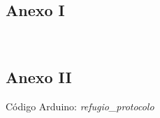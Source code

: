 \documentclass[12pt]{article}
\begin{document}
	\subsection*{Anexo I}
	\label{anexo I: ficha tecnica}
	 \\
	
	\pagebreak
	
	\subsection*{Anexo II}
	\label{anexo II: codigo}
	
	\noindent Código Arduino: \textit{refugio\_protocolo} \\
	
\end{document}

